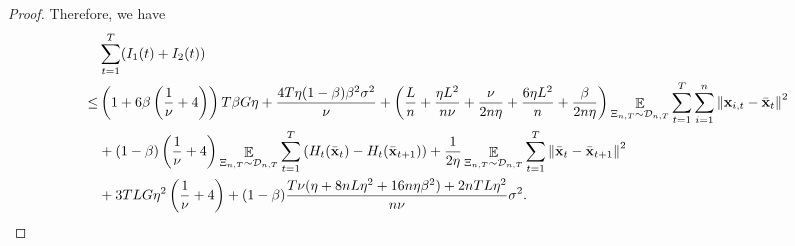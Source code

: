 \documentclass{article}
\begin{document}
\begin{proof}
Therefore, we have 
\begin{align}
\nonumber
&\sum_{t=1}^T (I_1(t) + I_2(t)) \\ \nonumber
\le & \left( 1 + 6\beta\left( \frac{1}{\nu}+4 \right) \right)T\beta G \eta + \frac{4T\eta (1-\beta)\beta^2 \sigma^2}{\nu} + \left(  \frac{L}{n} + \frac{\eta L^2}{n\nu} + \frac{\nu}{2n\eta} + \frac{6\eta L^2}{n}  + \frac{\beta}{2n\eta}  \right)\mathop{\mathbb{E}}_{ \Xi_{n,T} \sim \mathcal{D}_{n,T} }\sum_{t=1}^T\sum_{i=1}^n\left\lVert{\bf x}_{i,t} - \bar{{\bf x}}_t \right\rVert^2 \\ \nonumber 
&+ (1-\beta) \left( \frac{1}{\nu} + 4 \right)\mathop{\mathbb{E}}_{ \Xi_{n,T} \sim \mathcal{D}_{n,T} }\sum_{t=1}^T \left( H_t(\bar{{\bf x}}_t) - H_t(\bar{{\bf x}}_{t+1}) \right) + \frac{1}{2\eta}\mathop{\mathbb{E}}_{ \Xi_{n,T} \sim \mathcal{D}_{n,T} }\sum_{t=1}^T\left\lVert \bar{{\bf x}}_t - \bar{{\bf x}}_{t+1}\right\rVert^2 \\ \label{equa_H_bound_temp0} 
& + 3TLG\eta^2\left(  \frac{1}{\nu} + 4  \right) + (1-\beta)\frac{T\nu(\eta + 8nL\eta^2 + 16n\eta\beta^2) + 2nTL\eta^2}{n\nu} \sigma^2.
\end{align} 









\end{proof}
\end{document}
